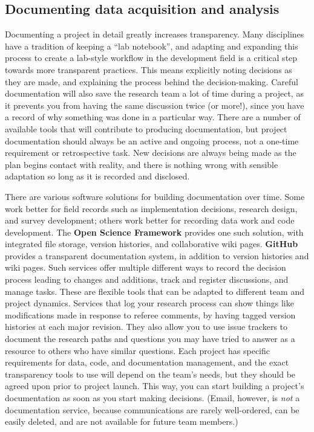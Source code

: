 \subsection{Documenting data acquisition and analysis}

Documenting a project in detail greatly increases transparency.
Many disciplines have a tradition of keeping a ``lab notebook'',
and adapting and expanding this process to create a
lab-style workflow in the development field is a
critical step towards more transparent practices.
This means explicitly noting decisions as they are made,
and explaining the process behind the decision-making.
Careful documentation will also save the research team a lot of time during a project,
as it prevents you from having the same discussion twice (or more!),
since you have a record of why something was done in a particular way.
There are a number of available tools
that will contribute to producing documentation,
but project documentation should always be an active and ongoing process,
not a one-time requirement or retrospective task.
New decisions are always being made as the plan begins contact with reality,
and there is nothing wrong with sensible adaptation so long as it is recorded and disclosed.

There are various software solutions for building documentation over time.
Some work better for field records such as implementation decisions,
research design, and survey development;
others work better for recording data work and code development.
The \textbf{Open Science Framework} provides one such solution,
with integrated file storage, version histories, and collaborative wiki pages.
\textbf{GitHub} provides a transparent documentation system,
in addition to version histories and wiki pages.
Such services offer multiple different ways
to record the decision process leading to changes and additions,
track and register discussions, and manage tasks.
These are flexible tools that can be adapted to different team and project dynamics.
Services that log your research process can show things like modifications made in response to referee comments,
by having tagged version histories at each major revision.
They also allow you to use issue trackers
to document the research paths and questions you may have tried to answer
as a resource to others who have similar questions.
Each project has specific requirements for data, code, and documentation management,
and the exact transparency tools to use will depend on the team's needs,
but they should be agreed upon prior to project launch.
This way, you can start building a project's documentation as soon as you start making decisions.
(Email, however, is \textit{not} a documentation service, because communications are rarely well-ordered,
can be easily deleted, and are not available for future team members.)

